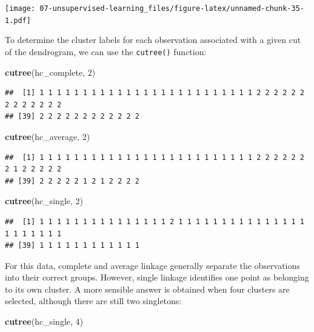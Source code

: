 \documentclass[
  openany]{book}
\newenvironment{Shaded}{\begin{snugshade}}{\end{snugshade}}
\newcommand{\DecValTok}[1]{\textcolor[rgb]{0.00,0.00,0.81}{#1}}
\newcommand{\KeywordTok}[1]{\textcolor[rgb]{0.13,0.29,0.53}{\textbf{#1}}}
\newcommand{\NormalTok}[1]{#1}
\begin{document}
\texttt{[image: 07-unsupervised-learning\_files/figure-latex/unnamed-chunk-35-1.pdf]}

To determine the cluster labels for each observation associated with a
given cut of the dendrogram, we can use the \texttt{cutree()} function:

\begin{Shaded}
\begin{Highlighting}[]
\KeywordTok{cutree}\NormalTok{(hc_complete, }\DecValTok{2}\NormalTok{)}
\end{Highlighting}
\end{Shaded}

\begin{verbatim}
##  [1] 1 1 1 1 1 1 1 1 1 1 1 1 1 1 1 1 1 1 1 1 1 1 1 1 1 2 2 2 2 2 2 2 2 2 2 2 2 2
## [39] 2 2 2 2 2 2 2 2 2 2 2 2
\end{verbatim}

\begin{Shaded}
\begin{Highlighting}[]
\KeywordTok{cutree}\NormalTok{(hc_average, }\DecValTok{2}\NormalTok{)}
\end{Highlighting}
\end{Shaded}

\begin{verbatim}
##  [1] 1 1 1 1 1 1 1 1 1 1 1 1 1 1 1 1 1 1 1 1 1 1 1 1 1 2 2 2 2 2 2 2 1 2 2 2 2 2
## [39] 2 2 2 2 2 1 2 1 2 2 2 2
\end{verbatim}

\begin{Shaded}
\begin{Highlighting}[]
\KeywordTok{cutree}\NormalTok{(hc_single, }\DecValTok{2}\NormalTok{)}
\end{Highlighting}
\end{Shaded}

\begin{verbatim}
##  [1] 1 1 1 1 1 1 1 1 1 1 1 1 1 1 1 2 1 1 1 1 1 1 1 1 1 1 1 1 1 1 1 1 1 1 1 1 1 1
## [39] 1 1 1 1 1 1 1 1 1 1 1 1
\end{verbatim}

For this data, complete and average linkage generally separate the observations
into their correct groups. However, single linkage identifies one point
as belonging to its own cluster. A more sensible answer is obtained when
four clusters are selected, although there are still two singletons:

\begin{Shaded}
\begin{Highlighting}[]
\KeywordTok{cutree}\NormalTok{(hc_single, }\DecValTok{4}\NormalTok{)}
\end{Highlighting}
\end{Shaded}
\end{document}
